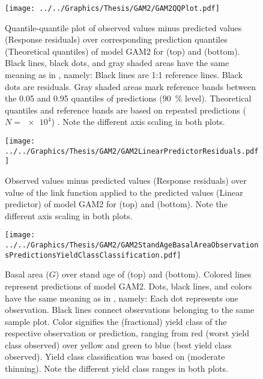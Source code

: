\begin{figure}[h]
  \centering
  \texttt{[image: ../../Graphics/Thesis/GAM2/GAM2QQPlot.pdf]}
  \caption{Quantile-quantile plot of observed values minus predicted values (Response residuals) over corresponding prediction quantiles (Theoretical quantiles) of model GAM2 for \Beech{} (top) and \Spruce{} (bottom).  Black lines, black dots, and gray shaded areas have the same meaning as in , namely:  Black lines are 1:1 reference lines.  Black dots are residuals.  Gray shaded areas mark reference bands between the \num{0.05} and \num{0.95} quantiles of predictions (\SI{90}{\percent} level).  Theoretical quantiles and reference bands are based on repeated predictions (\(N = \num{e4}\)) \parencite{Augustin2012}.  Note the different axis scaling in both plots.}
  \label{fig:GAM2QQPlot}
\end{figure}

\begin{figure}[h]
  \centering
  \texttt{[image: ../../Graphics/Thesis/GAM2/GAM2LinearPredictorResiduals.pdf]}
  \caption{Observed values minus predicted values (Response residuals) over value of the link function applied to the predicted values (Linear predictor) of model GAM2 for \Beech{} (top) and \Spruce{} (bottom).  Note the different axis scaling in both plots.}
  \label{fig:GAM2LinearPredictorResiduals}
\end{figure}

\begin{figure}[h]
  \centering
  \texttt{[image: ../../Graphics/Thesis/GAM2/GAM2StandAgeBasalAreaObservationsPredictionsYieldClassClassification.pdf]}
  \caption{Basal area (\(G\)) over stand age of \Beech{} (top) and \Spruce{} (bottom).  Colored lines represent predictions of model GAM2.  Dots, black lines, and colors have the same meaning as in , namely:  Each dot represents one observation.  Black lines connect observations belonging to the same sample plot.  Color signifies the (fractional) yield class of the respective observation or prediction, ranging from red (worst yield class observed) over yellow and green to blue (best yield class observed). Yield class classification was based on \textcite{Schober1995} (moderate thinning).  Note the different yield class ranges in both plots.}
  \label{fig:GAM2StandAgeBasalAreaObservationsPredictionsYieldClassClassification}
\end{figure}

